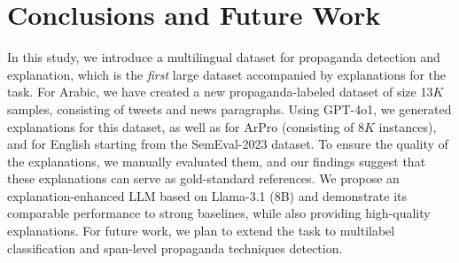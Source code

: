 \section{Conclusions and Future Work}
\label{sec:conclusions}
In this study, we introduce a multilingual dataset for propaganda detection and explanation, which is the \textit{first} large dataset accompanied by explanations for the task. For Arabic, we have created a new propaganda-labeled dataset of size 13$K$ samples, consisting of tweets and news paragraphs. Using GPT-4o1, we generated explanations for this dataset, as well as for ArPro (consisting of 8$K$ instances), and for English starting from the SemEval-2023 dataset. 
To ensure the quality of the explanations, we manually evaluated them, and our findings suggest that these explanations can serve as gold-standard references. %
 We propose an explanation-enhanced LLM based on Llama-3.1 (8B) and demonstrate its comparable performance to strong baselines, while also providing high-quality explanations. 
For future work, we plan to extend the task to multilabel classification and span-level propaganda techniques detection.



